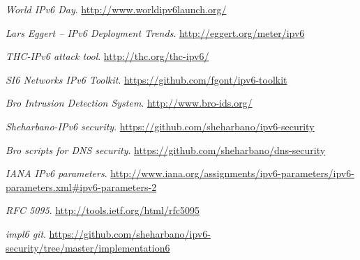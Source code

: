 \documentclass{article}
\begin{document}
\begin{thebibliography}{20}
  
  \emph{World IPv6 Day}.
  \url{http://www.worldipv6launch.org/}

  \emph{Lars Eggert – IPv6 Deployment Trends}.
  \url{http://eggert.org/meter/ipv6}
  
  \emph{THC-IPv6 attack tool}.
  \url{http://thc.org/thc-ipv6/}
  
  \emph{SI6 Networks IPv6 Toolkit}.
  \url{https://github.com/fgont/ipv6-toolkit}
  
  
  \emph{Bro Intrusion Detection System}.
  \url{  http://www.bro-ids.org/}
  
  \emph{Sheharbano-IPv6 security}.
  \url{https://github.com/sheharbano/ipv6-security}
  
  \emph{Bro scripts for DNS security}.
  \url{https://github.com/sheharbano/dns-security}
  
  \emph{IANA IPv6 parameters}.
  \url{http://www.iana.org/assignments/ipv6-parameters/ipv6-parameters.xml#ipv6-parameters-2}
  
  \emph{RFC 5095}.
  \url{http://tools.ietf.org/html/rfc5095}
  
  \emph{impl6 git}.
  \url{https://github.com/sheharbano/ipv6-security/tree/master/implementation6}
    
\end{thebibliography}
\end{document}
